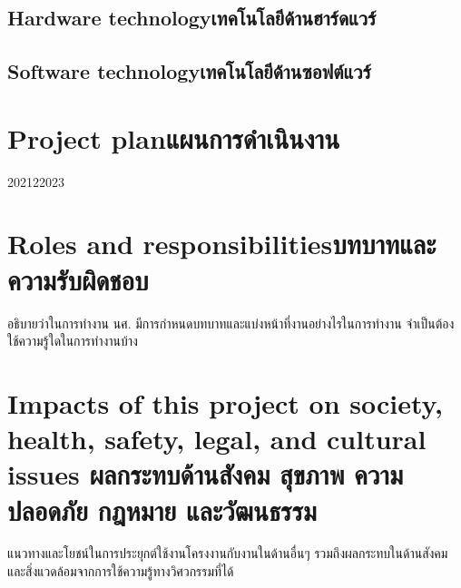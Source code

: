\subsection{\ifenglish Hardware technology\else เทคโนโลยีด้านฮาร์ดแวร์\fi}

\subsection{\ifenglish Software technology\else เทคโนโลยีด้านซอฟต์แวร์\fi}

\section{\ifenglish Project plan\else แผนการดำเนินงาน\fi}

\begin{plan}{12}{2021}{2}{2023}
\end{plan}

\section{\ifenglish Roles and responsibilities\else บทบาทและความรับผิดชอบ\fi}
อธิบายว่าในการทำงาน นศ. มีการกำหนดบทบาทและแบ่งหน้าที่งานอย่างไรในการทำงาน จำเป็นต้องใช้ความรู้ใดในการทำงานบ้าง

\section{\ifenglish%
Impacts of this project on society, health, safety, legal, and cultural issues
\else%
ผลกระทบด้านสังคม สุขภาพ ความปลอดภัย กฎหมาย และวัฒนธรรม
\fi}

แนวทางและโยชน์ในการประยุกต์ใช้งานโครงงานกับงานในด้านอื่นๆ รวมถึงผลกระทบในด้านสังคมและสิ่งแวดล้อมจากการใช้ความรู้ทางวิศวกรรมที่ได้
